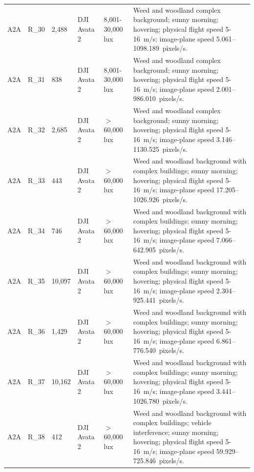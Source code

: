 \begin{longtable}{@{}C{0.045\textwidth} C{0.083\textwidth} C{0.075\textwidth} C{0.13\textwidth} C{0.15\textwidth} L{0.48\textwidth}@{}}
A2A & R\_30 & 2,488 & DJI Avata 2 & 8,001-30,000 lux & Weed and woodland complex background; sunny morning; hovering; physical flight speed 5-16~m/s; image-plane speed 5.061--1098.189~pixels/s. \\

A2A & R\_31 & 838 & DJI Avata 2 & 8,001-30,000 lux & Weed and woodland complex background; sunny morning; hovering; physical flight speed 5-16~m/s; image-plane speed 2.001--986.010~pixels/s. \\

A2A & R\_32 & 2,685 & DJI Avata 2 & $>$60,000 lux & Weed and woodland complex background; sunny morning; hovering; physical flight speed 5-16~m/s; image-plane speed 3.146--1130.525~pixels/s. \\

A2A & R\_33 & 443 & DJI Avata 2 & $>$60,000 lux & Weed and woodland background with complex buildings; sunny morning; hovering; physical flight speed 5-16~m/s; image-plane speed 17.205--1026.926~pixels/s. \\

A2A & R\_34 & 746 & DJI Avata 2 & $>$60,000 lux & Weed and woodland background with complex buildings; sunny morning; hovering; physical flight speed 5-16~m/s; image-plane speed 7.066--642.905~pixels/s. \\

A2A & R\_35 & 10,097 & DJI Avata 2 & $>$60,000 lux & Weed and woodland background with complex buildings; sunny morning; hovering; physical flight speed 5-16~m/s; image-plane speed 2.304--925.441~pixels/s. \\

A2A & R\_36 & 1,429 & DJI Avata 2 & $>$60,000 lux & Weed and woodland background with complex buildings; sunny morning; hovering; physical flight speed 5-16~m/s; image-plane speed 6.861--776.540~pixels/s. \\

A2A & R\_37 & 10,162 & DJI Avata 2 & $>$60,000 lux & Weed and woodland background with complex buildings; sunny morning; hovering; physical flight speed 5-16~m/s; image-plane speed 3.441--1026.780~pixels/s. \\

A2A & R\_38 & 412 & DJI Avata 2 & $>$60,000 lux & Weed and woodland background with complex buildings; vehicle interference; sunny morning; hovering; physical flight speed 5-16~m/s; image-plane speed 59.929--725.846~pixels/s. \\


\end{longtable}
